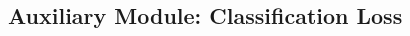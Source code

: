 \documentclass[10pt,twocolumn,letterpaper]{article}
\begin{document}
\begin{CJK}{UTF8}{mj}
\begin{comment}
\begin{table*}[h!t!]
\begin{center}
\begin{adjustbox}{width=.95\width,center}
\begin{tabular}{c|cccccccccccc}
\hline
\multirow{2}{*}{Loss} & \multicolumn{12}{c}{Configuration}                                                                                                                                                                                                                                                               \\ \cline{2-13} 
                      & \multicolumn{1}{c|}{S} & \multicolumn{1}{c|}{M} & \multicolumn{1}{c|}{G} & \multicolumn{1}{c|}{SM} & \multicolumn{1}{c|}{MS} & \multicolumn{1}{c|}{SG} & \multicolumn{1}{c|}{GS} & \multicolumn{1}{c|}{MG} & \multicolumn{1}{c|}{GM} & \multicolumn{1}{c|}{SMG} & \multicolumn{1}{c|}{MSG} & GSM \\ \hline\hline
Classification        & \multicolumn{1}{c|}{S} & \multicolumn{1}{c|}{M} & \multicolumn{1}{c|}{G} & \multicolumn{1}{c|}{S}  & \multicolumn{1}{c|}{M}  & \multicolumn{1}{c|}{S}  & \multicolumn{1}{c|}{G}  & \multicolumn{1}{c|}{M}  & \multicolumn{1}{c|}{G}  & \multicolumn{1}{c|}{S}   & \multicolumn{1}{c|}{M}   & G   \\
Ranking               & \multicolumn{1}{c|}{S} & \multicolumn{1}{c|}{M} & \multicolumn{1}{c|}{G} & \multicolumn{1}{c|}{S$\oplus$M} & \multicolumn{1}{c|}{M$\oplus$S} & \multicolumn{1}{c|}{S$\oplus$G} & \multicolumn{1}{c|}{G$\oplus$S} & \multicolumn{1}{c|}{M$\oplus$G} & \multicolumn{1}{c|}{G$\oplus$M} & \multicolumn{1}{c|}{S$\oplus$M$\oplus$G} & \multicolumn{1}{c|}{M$\oplus$S$\oplus$G} & G$\oplus$S$\oplus$M
\end{tabular}
\end{adjustbox}

\end{center}
\caption{Recall@K $\pm$ std. dev. comparison between using only the ranking loss (Rank) and using both the classification and ranking losses (Both) on CARS196.
We report results over five runs.}
\label{table:temp}
\end{table*}
\end{comment}

\subsection{Auxiliary Module: Classification Loss} \label{sec:auxiliary_module}


\end{CJK}
\end{document}
